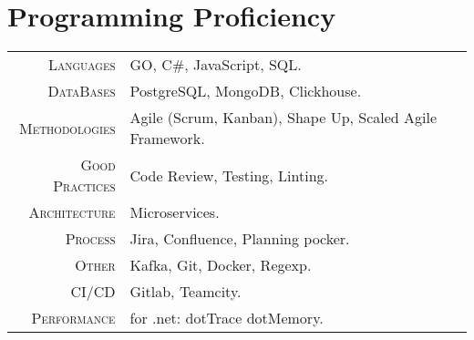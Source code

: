 \documentclass[a4paper,11pt]{article}
\begin{document}
\section{Programming Proficiency}
\begin{tabular}{rl}
  \textsc{Languages}& GO, C\#, JavaScript, SQL.\\
  \textsc{DataBases}& PostgreSQL, MongoDB, Clickhouse.\\ %
  \textsc{Methodologies}& Agile (Scrum, Kanban), Shape Up, Scaled Agile Framework.\\
  \textsc{Good Practices}& Code Review, Testing, Linting.\\
  \textsc{Architecture}& Microservices.\\
  \textsc{Process}& Jira, Confluence, Planning pocker.\\
  \textsc{Other}& Kafka, Git, Docker, Regexp.\\
  \textsc{CI/CD}& Gitlab, Teamcity. \\
  \textsc{Performance}& for .net: dotTrace dotMemory.\\
  
  
  

\end{tabular}
\end{document}
